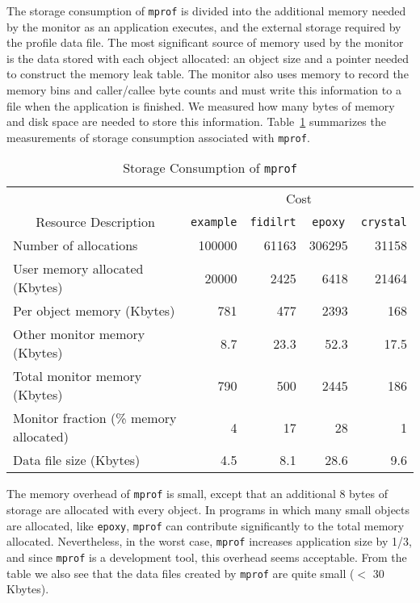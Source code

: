 The storage consumption of {\tt mprof} is divided into the additional
memory needed by the monitor as an application executes, and the
external storage required by the profile data file.  The most
significant source of memory used by the monitor is the data stored
with each object allocated: an object size and a pointer needed to
construct the memory leak table.  The monitor also uses memory to
record the memory bins and caller/callee byte counts and must write
this information to a file when the application is finished.  We
measured how many bytes of memory and disk space are needed to store
this information.  Table~\ref{mem:tab} summarizes the measurements of
storage consumption associated with {\tt mprof}.

\begin{table}[htbp]
\begin{singlespace}
\begin{center}
\begin{tabular}{|l|r|r|r|r|} \hline
\multicolumn{1}{|c|}{} & \multicolumn{4}{|c|}{Cost} \\ \cline{2-5}
\multicolumn{1}{|c|}{Resource Description} & 
\multicolumn{1}{|c|}{\tt example} & 
\multicolumn{1}{|c|}{\tt fidilrt} & 
\multicolumn{1}{|c|}{\tt epoxy} & 
\multicolumn{1}{|c|}{\tt crystal} \\ \hline
Number of allocations & 100000 & 61163 & 306295 & 31158 \\
User memory allocated (Kbytes) & 20000 & 2425 & 6418  & 21464 \\
\hline
Per object memory (Kbytes) & 781 & 477 & 2393 & 168 \\
Other monitor memory (Kbytes) & 8.7 & 23.3 & 52.3 & 17.5 \\
Total monitor memory (Kbytes) & 790 & 500 & 2445 & 186 \\
Monitor fraction (\% memory allocated) & 4 & 17 & 28 & 1 \\
\hline
Data file size (Kbytes) & 4.5 & 8.1 & 28.6 & 9.6 \\
\hline 
\end{tabular}
\caption{Storage Consumption of {\tt mprof}}
\label{mem:tab}
\end{center}
\end{singlespace}
\end{table}

The memory overhead of {\tt mprof} is small, except that an additional
8 bytes of storage are allocated with every object.  In programs in
which many small objects are allocated, like {\tt epoxy}, {\tt mprof}
can contribute significantly to the total memory allocated.
Nevertheless, in the worst case, {\tt mprof} increases application
size by 1/3, and since {\tt mprof} is a development tool, this
overhead seems acceptable.  From the table we also see that the data
files created by {\tt mprof} are quite small ($<$ 30 Kbytes).

